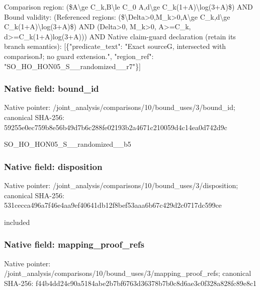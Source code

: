 \documentclass[10pt,a4paper]{article}
\begin{document}
\begingroup\raggedright\sloppy Comparison region:\allowbreak{} (\$A\textbackslash{}ge C\_\allowbreak{}k,\allowbreak{}B\textbackslash{}le C\_\allowbreak{}0 A,\allowbreak{}d\textbackslash{}ge C\_\allowbreak{}k(1+A)\textbackslash{}log(3+A)\$) AND Bound validity:\allowbreak{} (Referenced regions:\allowbreak{} (\$\textbackslash{}Delta>0,\allowbreak{}M\_\allowbreak{}k>0,\allowbreak{}A\textbackslash{}ge C\_\allowbreak{}k,\allowbreak{}d\textbackslash{}ge C\_\allowbreak{}k(1+A)\textbackslash{}log(3+A)\$) AND (Delta>0,\allowbreak{} M\_\allowbreak{}k>0,\allowbreak{} A>=\allowbreak{}C\_\allowbreak{}k,\allowbreak{} d>=\allowbreak{}C\_\allowbreak{}k(1+A)log(3+A))) AND Native claim-guard declaration (retain its branch semantics):\allowbreak{} [\{"predicate\_\allowbreak{}text":\allowbreak{} "Exact sourceG,\allowbreak{} intersected with comparisonJ;\allowbreak{} no guard extension.",\allowbreak{} "region\_\allowbreak{}ref":\allowbreak{} "SO\_\allowbreak{}HO\_\allowbreak{}HON05\_\allowbreak{}S\_\allowbreak{}\_\allowbreak{}randomized\_\allowbreak{}\_\allowbreak{}r7"\}]\par\endgroup

\subsubsection{Native field: bound\_\allowbreak{}id}
Native pointer: /joint\_\allowbreak{}analysis/comparisons/10/bound\_\allowbreak{}uses/3/bound\_\allowbreak{}id; canonical SHA-256: 59255e0ec759b8e56b49d7b6c288fe02193b2a4671c210059d4c14ea0d742d9c

\begingroup\raggedright\sloppy SO\_\allowbreak{}HO\_\allowbreak{}HON05\_\allowbreak{}S\_\allowbreak{}\_\allowbreak{}randomized\_\allowbreak{}\_\allowbreak{}b5\par\endgroup

\subsubsection{Native field: disposition}
Native pointer: /joint\_\allowbreak{}analysis/comparisons/10/bound\_\allowbreak{}uses/3/disposition; canonical SHA-256: 531cecca496a7f46e4aa9ef40641db12f8bef53aaa6b67c429d2c0717dc599ce

\begingroup\raggedright\sloppy included\par\endgroup

\subsubsection{Native field: mapping\_\allowbreak{}proof\_\allowbreak{}refs}
Native pointer: /joint\_\allowbreak{}analysis/comparisons/10/bound\_\allowbreak{}uses/3/mapping\_\allowbreak{}proof\_\allowbreak{}refs; canonical SHA-256: f44b4dd24c90a5184abe2b7bf6763d36378b7b0c8d6ae3c0f328a828fc89e8c1
\end{document}

